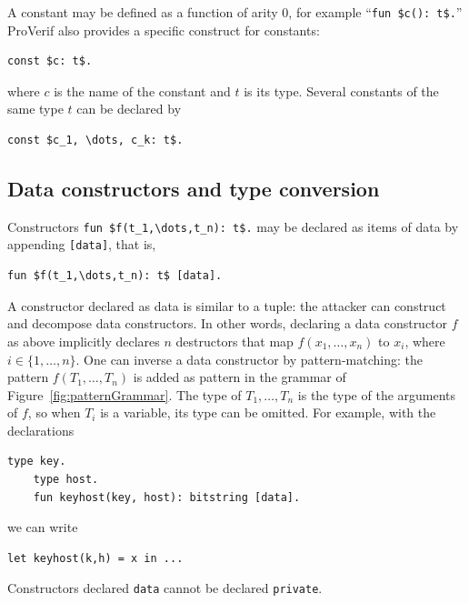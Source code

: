 \documentclass{book}
\begin{document}
A constant may be defined as a function of arity $0$, for example ``\lstinline!fun $c(): t$.!'' ProVerif also provides a specific construct for constants:
\begin{lstlisting}[numbers=none]
	const $c: t$.
\end{lstlisting}
where $c$ is the name of the constant and $t$ is its type.
Several constants of the same type $t$ can be declared by
\begin{lstlisting}[numbers=none]
	const $c_1, \dots, c_k: t$.
\end{lstlisting}

\subsection{Data constructors and type conversion}\label{sec:typeConversion}

Constructors \lstinline!fun $f(t_1,\dots,t_n): t$.! may be declared as items of data by appending \lstinline![data]!, that is,
\begin{lstlisting}[numbers=none]
	fun $f(t_1,\dots,t_n): t$ [data].
\end{lstlisting}
A constructor declared as data is similar to a tuple: the attacker can construct and decompose data constructors. In other words, declaring a data constructor $f$ as above implicitly declares $n$ destructors that map $f(x_1, \ldots, x_n)$ to $x_i$, where $i\in\{1,\dots,n\}$. One can inverse a data constructor by pattern-matching: the pattern $f(T_1, \ldots, T_n)$ is added as pattern in the grammar of Figure~\ref{fig:patternGrammar}. The type of $T_1, \ldots, T_n$ is the type of the arguments of $f$, so when $T_i$ is a variable, its type can be omitted. For example, with the declarations
\begin{lstlisting}[numbers=none]
	type key.
	type host.
	fun keyhost(key, host): bitstring [data].
\end{lstlisting}
we can write
\begin{lstlisting}[numbers=none]
	let keyhost(k,h) = x in ...
\end{lstlisting}
Constructors declared \lstinline!data! cannot be declared \lstinline!private!.
\end{document}
